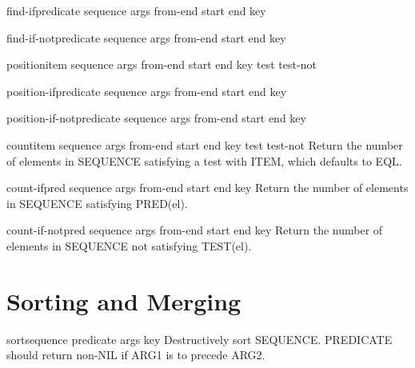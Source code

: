 \documentclass[10pt,english]{book}
\begin{document}
\begin{function}{find-if}{predicate sequence \rest args \key from-end start end key}
  
\end{function}

\begin{function}{find-if-not}{predicate sequence \rest args \key from-end start end key}
  
\end{function}

\begin{function}{position}{item sequence \rest args \key from-end start end key test test-not}
  
\end{function}

\begin{function}{position-if}{predicate sequence \rest args \key from-end start end key}
  
\end{function}

\begin{function}{position-if-not}{predicate sequence \rest args \key from-end start end key}
  
\end{function}

\begin{function}{count}{item sequence \rest args \key from-end start end key test test-not}
  Return the number of elements in SEQUENCE satisfying a test with ITEM,
  which defaults to EQL.
\end{function}

\begin{function}{count-if}{pred sequence \rest args \key from-end start end key}
  Return the number of elements in SEQUENCE satisfying PRED(el).
\end{function}

\begin{function}{count-if-not}{pred sequence \rest args \key from-end start end key}
  Return the number of elements in SEQUENCE not satisfying TEST(el).
\end{function}

\section{Sorting and Merging}
\label{sec:sorting-merging}

\begin{function}{sort}{sequence predicate \rest args \key key}
  Destructively sort SEQUENCE. PREDICATE should return non-NIL if
  ARG1 is to precede ARG2.
\end{function}
\end{document}
